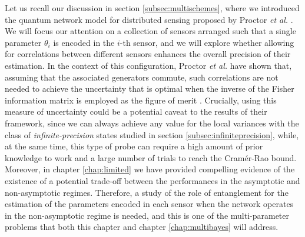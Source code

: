 Let us recall our discussion in section \ref{subsec:multischemes}, where we introduced the quantum network model for distributed sensing proposed by Proctor \emph{et al.} \cite{proctor2017networked, proctor2017networkedshort}. We will focus our attention on a collection of sensors arranged such that a single parameter $\theta_i$ is encoded in the $i$-th sensor, and we will explore whether allowing for correlations between different sensors enhances the overall precision of their estimation. In the context of this configuration, Proctor \emph{et al.} \cite{proctor2017networked, proctor2017networkedshort} have shown that, assuming that the associated generators commute, such correlations are not needed to achieve the uncertainty that is optimal when the inverse of the Fisher information matrix is employed as the figure of merit \cite{proctor2017networked, proctor2017networkedshort}. Crucially, using this measure of uncertainty could be a potential caveat to the results of their framework, since we can always achieve any value for the local variances with the class of \emph{infinite-precision} states studied in section \ref{subsec:infiniteprecision}, while, at the same time, this type of probe can require a high amount of prior knowledge to work and a large number of trials to reach the Cram\'{e}r-Rao bound. Moreover, in chapter \ref{chap:limited} we have provided compelling evidence of the existence of a potential trade-off between the performances in the asymptotic and non-asymptotic regimes. Therefore, a study of the role of entanglement for the estimation of the parameters encoded in each sensor when the network operates in the non-asymptotic regime is needed, and this is one of the multi-parameter problems that both this chapter and chapter \ref{chap:multibayes} will address.

